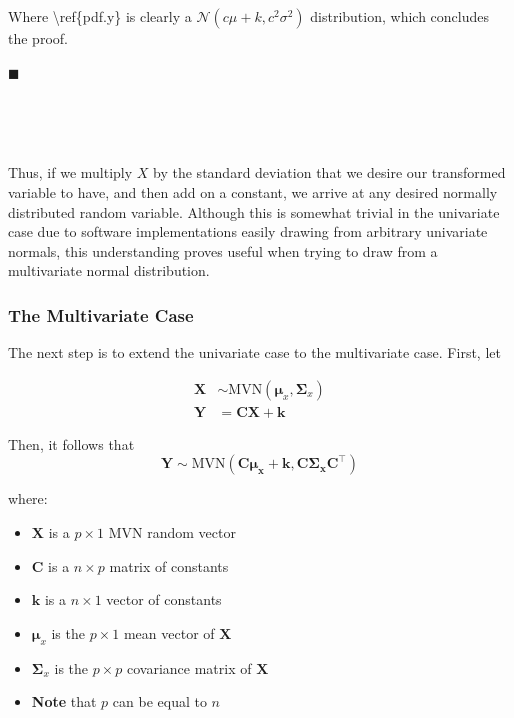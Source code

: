 \documentclass[
]{article}
\providecommand{\tightlist}{%
  \setlength{\itemsep}{0pt}\setlength{\parskip}{0pt}}
\begin{document}
Where \textbackslash ref\{pdf.y\} is clearly a
\(\mathcal{N}(c\mu+k, c^2\sigma^2)\) distribution, which concludes the
proof.

{\(\blacksquare\)}

~

~

Thus, if we multiply \(X\) by the standard deviation that we desire our
transformed variable to have, and then add on a constant, we arrive at
any desired normally distributed random variable. Although this is
somewhat trivial in the univariate case due to software implementations
easily drawing from arbitrary univariate normals, this understanding
proves useful when trying to draw from a multivariate normal
distribution.

\hypertarget{the-multivariate-case}{%
\subsubsection{The Multivariate Case}\label{the-multivariate-case}}

The next step is to extend the univariate case to the multivariate case.
First, let

\begin{align}
\boldsymbol{X} &\sim \mathrm{MVN}(\boldsymbol{\mu}_x, \boldsymbol{\Sigma}_x) \nonumber \\[1ex]
\boldsymbol{Y} &= \boldsymbol{CX} + \boldsymbol{k} \nonumber
\end{align}

Then, it follows that
\[\boldsymbol{Y} \sim \mathrm{MVN}(\boldsymbol{C\mu_x} + \boldsymbol{k}, \boldsymbol{ C\Sigma_x C^\top})\]

where:

\begin{itemize}
\tightlist
\item
  \(\boldsymbol{X}\) is a \(p \times 1\) MVN random vector
\item
  \(\boldsymbol{C}\) is a \(n \times p\) matrix of constants
\item
  \(\boldsymbol{k}\) is a \(n \times 1\) vector of constants
\item
  \(\boldsymbol{\mu}_x\) is the \(p \times 1\) mean vector of
  \(\boldsymbol{X}\)
\item
  \(\boldsymbol{\Sigma}_x\) is the \(p \times p\) covariance matrix of
  \(\boldsymbol{X}\)
\item
  \textbf{Note} that \(p\) can be equal to \(n\)
\end{itemize}
\end{document}
